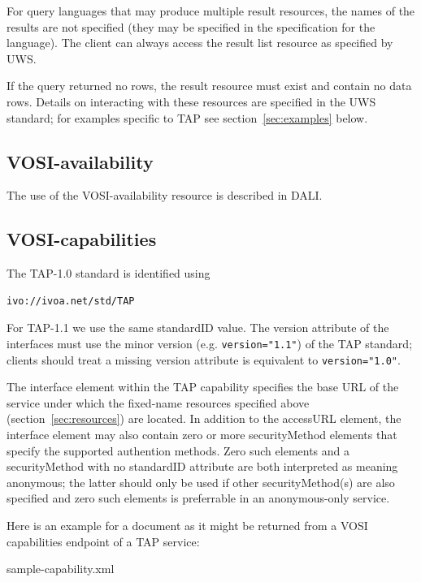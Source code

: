 \documentclass[11pt,letter]{ivoa}
\begin{document}
For query languages that may produce multiple result resources, the names of the 
results are not specified (they may be specified in the specification for the 
language). The client can always access the result list resource as specified by 
UWS.

If the query returned no rows, the result resource must exist and contain no 
data rows. Details on interacting with these resources are specified in the UWS 
standard; for examples specific to TAP see section~\ref{sec:examples} below.

\subsection{VOSI-availability}
\label{sec:vosi-availability}

The use of the VOSI-availability resource is described in DALI.

\subsection{VOSI-capabilities}
\label{sec:vosi-capabilities}

The TAP-1.0 standard is identified using 
\begin{verbatim}
ivo://ivoa.net/std/TAP
\end{verbatim}

For TAP-1.1 we use the same standardID value. The version attribute of the interfaces 
must use the minor version (e.g. \verb|version="1.1"|) of the TAP standard; clients 
should treat a missing version attribute is equivalent to \verb|version="1.0"|.

The interface element within the TAP capability specifies the base URL of the service 
under which the fixed-name resources specified above (section~\ref{sec:resources}) are located.
In addition to the accessURL element, the interface element may also contain zero or more securityMethod 
elements that specify the supported authention methods. Zero such elements and a securityMethod with no standardID attribute are both interpreted as meaning anonymous; the latter should only be used if other securityMethod(s) are also specified and zero such elements is preferrable in an anonymous-only service.

Here is an example for a document as it might be returned from a VOSI
capabilities endpoint of a TAP service:


  {sample-capability.xml}
\end{document}
